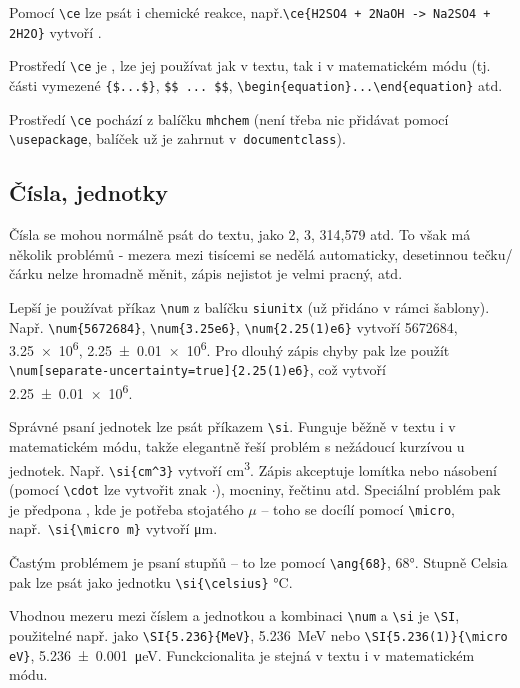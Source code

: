 \documentclass{cygclanek}
\begin{document}
Pomocí \verb|\ce| lze psát i chemické reakce, např.\verb|\ce{H2SO4 + 2NaOH -> Na2SO4 + 2H2O}| vytvoří .

    Prostředí \verb|\ce| je , lze jej používat jak v textu, tak i v matematickém módu 
    (tj. části vymezené \verb|{$...$}|, \verb|$$ ... $$|, \verb|\begin{equation}...\end{equation}| atd.

Prostředí \verb|\ce| pochází z balíčku \verb|mhchem| \cite{ctan_mhchem} (není třeba nic přidávat 
pomocí \verb|\usepackage|, balíček už je zahrnut v~\verb|documentclass|).

\subsection{Čísla, jednotky}
Čísla se mohou normálně psát do textu, jako 2, 3, 314,579 atd. To však má několik 
problémů - mezera mezi tisícemi se nedělá automaticky, desetinnou tečku/čárku nelze hromadně měnit, 
zápis nejistot je velmi pracný, atd.

Lepší je používat příkaz \verb|\num| z balíčku \verb|siunitx| \cite{ctan_siunitx} (už přidáno 
v rámci šablony). Např. \verb|\num{5672684}|, \verb|\num{3.25e6}|, \verb|\num{2.25(1)e6}| vytvoří 
\num{5672684}, \num{3.25e6}, \num{2.25(1)e6}. Pro dlouhý zápis chyby pak lze použít 
\verb|\num[separate-uncertainty=true]{2.25(1)e6}|, což vytvoří \num[separate-uncertainty=true]{2.25(1)e6}.

    Správné psaní jednotek lze psát příkazem \verb|\si|. Funguje běžně v textu i v matematickém módu, takže 
    elegantně řeší problém s nežádoucí kurzívou u jednotek. Např. \verb|\si{cm^3}| vytvoří \si{cm^3}. 
    Zápis akceptuje lomítka nebo násobení (pomocí \verb|\cdot| lze vytvořit znak $\cdot$), mocniny, řečtinu atd. 
    Speciální problém pak je předpona , kde je potřeba stojatého $\mu$ -- toho se docílí pomocí 
    \verb|\micro|, např.~\verb|\si{\micro m}| vytvoří \si{\micro m}. 

    Častým problémem je psaní stupňů -- to lze pomocí \verb|\ang{68}|, \ang{68}. Stupně Celsia pak lze psát 
    jako jednotku \verb|\si{\celsius}| \si{\celsius}.


Vhodnou mezeru mezi číslem a jednotkou a kombinaci \verb|\num| a \verb|\si| je \verb|\SI|, použitelné např.
    jako \verb|\SI{5.236}{MeV}|, \SI{5.236}{MeV} nebo \verb|\SI{5.236(1)}{\micro eV}|, \SI{5.236(1)}{\micro eV}. 
    Funckcionalita je stejná v textu i v matematickém módu.
\end{document}

